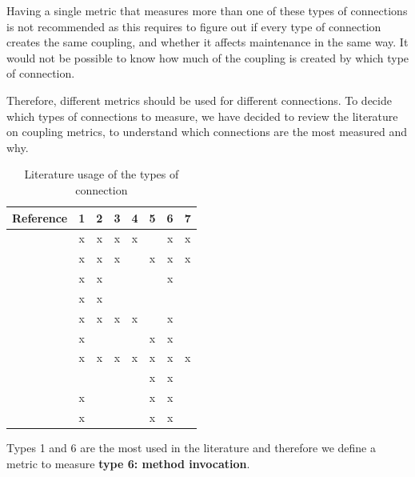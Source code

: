 \documentclass[a4paper]{article}
\begin{document}
Having a single metric that measures more than one of these types of connections is not recommended as this requires to figure out if every type of connection creates the same coupling, and whether it affects maintenance in the same way. It would not be possible to know how much of the coupling is created by which type of connection.

Therefore, different metrics should be used for different connections.
To decide which types of connections to measure, we have decided to review the literature on coupling metrics, to understand which connections are the most measured and why.

\begin{table}[ht!]
    \centering
    \begin{tabular}{|l|c|c|c|c|c|c|c|}
         \hline
         Reference                      & 1 & 2 & 3 & 4 & 5 & 6 & 7 \\\hline
         \cite{eder1994coupling}        & x & x & x & x &   & x & x \\\hline
         \cite{hitz1995measuring}       & x & x & x &   & x & x & x \\\hline
         \cite{briand1997investigation} & x & x &   &   &   & x &   \\\hline
         \cite{wilkie2000coupling}      & x & x &   &   &   &   &   \\\hline
         \cite{yang2005detecting}       & x & x & x & x &   & x &   \\\hline
         \cite{gui2007ranking}          & x &   &   &   & x & x &   \\\hline
         \cite{gupta2009package}        & x & x & x & x & x & x & x \\\hline
         \cite{harrison1998coupling}    &   &   &   &   & x & x &   \\\hline
         \cite{du2004refactoring}       & x &   &   &   & x & x &   \\\hline
         \cite{koetter2019assessing}    & x &   &   &   & x & x &   \\\hline
    \end{tabular}
    \caption{Literature usage of the types of connection}
    \label{tab:type-con-literature}
\end{table}

 Types 1 and 6 are the most used in the literature and therefore we define a metric to measure \textbf{type 6: method invocation}.
\end{document}
